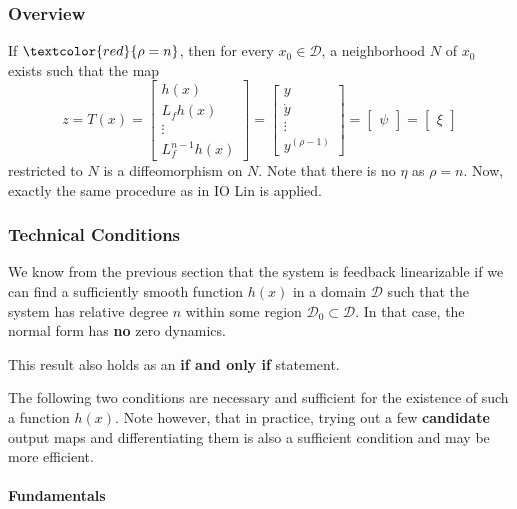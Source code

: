 \subsubsection{Overview}

If $\textcolor{red}{\rho = n}$, then for every $x_0 \in \mathcal{D}$, a neighborhood $N$ of $x_0$ exists such that the map
\begin{equation*}
    z = T(x) =
    \begin{bmatrix}
        h(x)     \\
        L_f h(x) \\
        \vdots   \\
        L_f^{n - 1} h(x)
    \end{bmatrix}=
    \begin{bmatrix}
        y       \\
        \dot{y} \\
        \vdots  \\
        y^{(\rho - 1)}
    \end{bmatrix} =
    \begin{bmatrix}
        \psi
    \end{bmatrix}=
    \begin{bmatrix}
        \xi
    \end{bmatrix}
\end{equation*}
restricted to $N$ is a diffeomorphism on $N$. Note that there is no $\eta$ as $\rho = n$.
\newpar{}
Now, exactly the same procedure as in IO Lin is applied.

\subsubsection{Technical Conditions}

We know from the previous section that the system is feedback linearizable if we can find a sufficiently smooth function $h(x)$ in a domain $\mathcal{D}$ such that the system has relative degree $n$ within some region $\mathcal{D}_0 \subset \mathcal{D}$. In that case, the normal form has \textbf{no} zero dynamics.

This result also holds as an \textbf{if and only if} statement.

The following two conditions are necessary and sufficient for the existence of such a function $h(x)$. Note however, that in practice, trying out a few \textbf{candidate} output maps and differentiating them is also a sufficient condition and may be more efficient.

\paragraph{Fundamentals}

